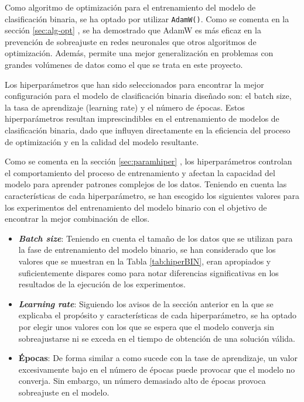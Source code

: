 Como algoritmo de optimización para el entrenamiento del modelo de clasificación binaria, se ha optado por utilizar \texttt{AdamW()}. Como se comenta en la sección \ref{sec:alg-opt} , se ha demostrado que AdamW es más eficaz en la prevención de sobreajuste en redes neuronales que otros algoritmos de optimización. Además, permite una mejor generalización en problemas con grandes volúmenes de datos como el que se trata en este proyecto.

Los hiperparámetros que han sido seleccionados para encontrar la mejor configuración para el modelo de clasificación binaria diseñado son: el batch size, la tasa de aprendizaje (learning rate) y el número de épocas. Estos hiperparámetros resultan imprescindibles en el entrenamiento de modelos de clasificación binaria, dado que influyen directamente en la eficiencia del proceso de optimización y en la calidad del modelo resultante.

Como se comenta en la sección \ref{sec:paramhiper} , los hiperparámetros controlan el comportamiento del proceso de entrenamiento y afectan la capacidad del modelo para aprender patrones complejos de los datos. Teniendo en cuenta las características de cada hiperparámetro, se han escogido los siguientes valores para los experimentos del entrenamiento del modelo binario con el objetivo de encontrar la mejor combinación de ellos.

\begin{itemize}
	\item \textbf{\textit{Batch size}}: Teniendo en cuenta el tamaño de los datos que se utilizan para la fase de entrenamiento del modelo binario, se han considerado que los valores que se muestran en la Tabla \ref{tab:hiperBIN}, eran apropiados y suficientemente dispares como para notar diferencias significativas en los resultados de la ejecución de los experimentos.
	\item \textbf{\textit{Learning rate}}: Siguiendo los avisos de la sección anterior en la que se explicaba el propósito y características de cada hiperparámetro, se ha optado por elegir unos valores con los que se espera que el modelo converja sin sobreajustarse ni se exceda en el tiempo de obtención de una solución válida.
	\item \textbf{Épocas}: De forma similar a como sucede con la tase de aprendizaje, un valor excesivamente bajo en el número de épocas puede provocar que el modelo no converja. Sin embargo, un número demasiado alto de épocas provoca sobreajuste en el modelo.
\end{itemize}

